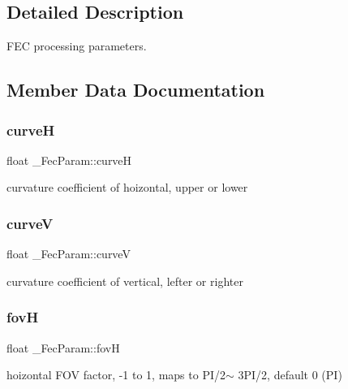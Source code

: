 \subsection{Detailed Description}
F\+EC processing parameters. 

\subsection{Member Data Documentation}
\mbox{\label{struct___fec_param_a25e29757d04be1e6b7b1cf8709670d49}} 
\subsubsection{\texorpdfstring{curveH}{curveH}}
{\footnotesize\ttfamily float \+\_\+\+Fec\+Param\+::curveH}

curvature coefficient of hoizontal, upper or lower \mbox{\label{struct___fec_param_aa254903d8631ae012dc4c3d4b0ab3969}} 
\subsubsection{\texorpdfstring{curveV}{curveV}}
{\footnotesize\ttfamily float \+\_\+\+Fec\+Param\+::curveV}

curvature coefficient of vertical, lefter or righter \mbox{\label{struct___fec_param_acc8b9b08bfeabd57a76ac89e7bac4a59}} 
\subsubsection{\texorpdfstring{fovH}{fovH}}
{\footnotesize\ttfamily float \+\_\+\+Fec\+Param\+::fovH}

hoizontal F\+OV factor, -\/1 to 1, maps to P\+I/2$\sim$ 3\+P\+I/2, default 0 (PI) \mbox{\label{struct___fec_param_a5f4a6533e68132c4a9d7fdbde282ed28}} 
